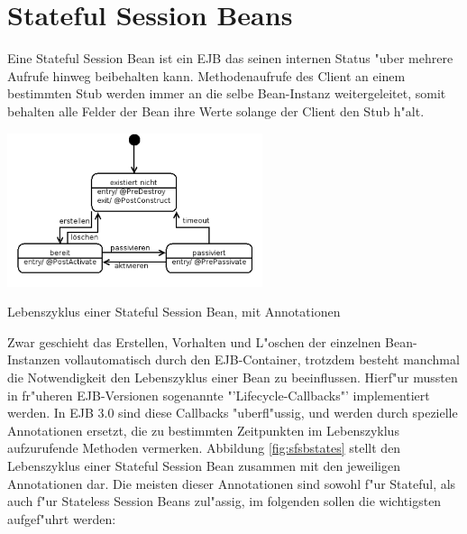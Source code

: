 \section{Stateful Session Beans}
\label{sec:chap2:sfsb}

Eine Stateful Session Bean ist ein EJB das seinen internen Status "uber mehrere Aufrufe hinweg beibehalten kann.
Methodenaufrufe des Client an einem bestimmten Stub werden immer an die selbe Bean-Instanz weitergeleitet, somit
behalten alle Felder der Bean ihre Werte solange der Client den Stub h"alt.
\begin{floatingfigure}[!h]{80mm}
\includegraphics[width=75mm]{chap2/img/sfsbstates.png}
\caption{Lebenszyklus einer Stateful Session Bean, mit Annotationen}
\label{fig:sfsbstates}
\end{floatingfigure}
Zwar geschieht das Erstellen, Vorhalten und L"oschen der einzelnen Bean-Instanzen vollautomatisch durch den EJB-Container, 
trotzdem besteht manchmal die Notwendigkeit den Lebenszyklus einer Bean zu beeinflussen. Hierf"ur mussten in fr"uheren
EJB-Versionen sogenannte "'Lifecycle-Callbacks"' implementiert werden. In EJB 3.0 sind diese Callbacks "uberfl"ussig,
und werden durch spezielle Annotationen ersetzt, die zu bestimmten Zeitpunkten im Lebenszyklus aufzurufende Methoden
vermerken. Abbildung \ref{fig:sfsbstates} stellt den Lebenszyklus einer Stateful Session Bean zusammen mit den jeweiligen
Annotationen dar.
Die meisten dieser Annotationen sind sowohl f"ur Stateful, als auch f"ur Stateless Session Beans zul"assig,
im folgenden sollen die wichtigsten aufgef"uhrt werden:
